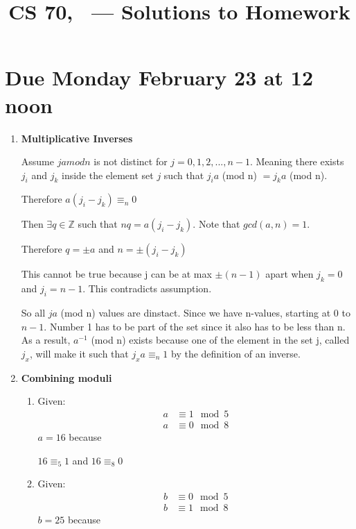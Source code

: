 \documentclass[12pt,fleqn]{article}
\title{CS 70, \Session\ --- Solutions to Homework \Homework}
\date{}
\begin{document}
\maketitle

\section*{Due Monday February 23 at 12 noon}



\begin{enumerate}
  
  \item \textbf{Multiplicative Inverses}
  
  Assume $ja mod n$ is not distinct for $j = 0, 1, 2, ..., n-1$. Meaning there exists $j_i$ and $j_k$ inside the element set $j$ such that $j_ia$ (mod n) $= j_ka$ (mod n). 
  
  Therefore $a(j_i - j_k) \equiv_n 0$

  Then $\exists q \in \mathbb{Z}$ such that $nq = a(j_i - j_k)$. Note that $gcd(a,n) = 1$.
  
  Therefore $q = \pm a$ and $n = \pm (j_i - j_k)$
  
  This cannot be true because j can be at max $\pm (n - 1)$ apart when $j_k = 0$ and $j_i = n - 1$. This contradicts assumption. 
  
  So all $ja$ (mod n) values are dinstact. Since we have n-values, starting at 0 to $n-1$. Number 1 has to be part of the set since it also has to be less than n. As a result, $a^{-1}$ (mod n) exists because one of the element in the set j, called $j_x$, will make it such that $j_xa \equiv_n 1$ by the definition of an inverse. 
  
  \newpage
  \item \textbf{Combining moduli}

  \begin{enumerate}
    \item Given:
    \begin{equation*}
      \begin{split}
        a & \equiv 1 \mod 5 \\
        a & \equiv 0 \mod 8
      \end{split}
    \end{equation*}
    $a = 16$ because 
    
    $16 \equiv_5 1$ and $16 \equiv_8 0$
    
    \item Given:
    \begin{equation*}
      \begin{split}
        b & \equiv 0 \mod 5 \\
        b & \equiv 1 \mod 8
      \end{split}
    \end{equation*}
    $b = 25$ because
    

\end{enumerate}
\end{enumerate}
\end{document}
